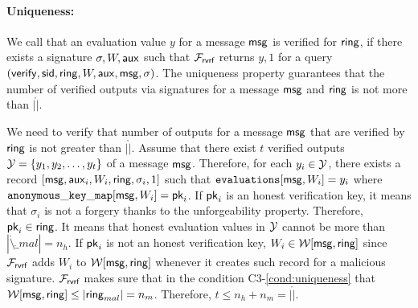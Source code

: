 \paragraph{Uniqueness:} We call that an evaluation value $ y $ for a message $ \mathsf{msg} $  is verified for $ \mathsf{ring} $, if there exists a signature $ \sigma, W,\mathsf{aux} $ such that $ \mathcal{F}_{\textsf{rvrf}}$ returns $ y, 1$ for a query $ (\mathsf{verify}, \textsf{sid}, \mathsf{ring},W,\mathsf{aux},\mathsf{msg},\sigma)$. The uniqueness property guarantees that the number of verified outputs via signatures for a message $ \mathsf{msg} $ and $ \mathsf{ring} $ is not more than $ |\ring| $.

We need to verify that number of outputs for a message $ \mathsf{msg} $ that are verified by  $ \mathsf{ring} $ is not greater than $ |\ring| $.
Assume that there exist $ t$ verified outputs $ {\mathcal{Y}} = \{y_1, y_2, \ldots, y_t\} $ of a message $ \mathsf{msg} $. Therefore, for each $ y_i \in {\ensuremath{\mathcal{Y}}} $, there exists a  record $ [\mathsf{msg}, \mathsf{aux}_i, W_i,\mathsf{ring},\sigma_i,1] $ such that  $\texttt{evaluations}[\mathsf{msg},W_i] = y_i $ where $ \mathtt{anonymous\_key\_map}[\mathsf{msg},W_i] = \mathsf{pk}_i $. If $ \mathsf{pk}_i $ is an honest verification key, it means that $ \sigma_i $ is not a forgery  thanks to the unforgeability property. Therefore, $ \mathsf{pk}_i \in \mathsf{ring} $. It means that honest evaluation values in $ {\mathcal{Y}} $ cannot be more than $ |\ring \setminus \ring_{mal}| = n_h $. If $ \mathsf{pk}_i $ is not an honest verification key, $ W_i \in \mathcal{W}[\mathsf{msg},\mathsf{ring}] $ since $ \mathcal{F}_{\textsf{rvrf}} $ adds $ W_i $ to $ \mathcal{W}[\mathsf{msg}, \mathsf{ring}] $ whenever it creates such record for a malicious signature. $ \mathcal{F}_{\textsf{rvrf}} $ makes sure that in the condition C3-\ref{cond:uniqueness} that $ \mathcal{W}[\mathsf{msg},\mathsf{ring}] \leq |\mathsf{ring}_{mal}| = n_m$. Therefore, $ t \leq n_h + n_m = |\ring| $.
%
%

